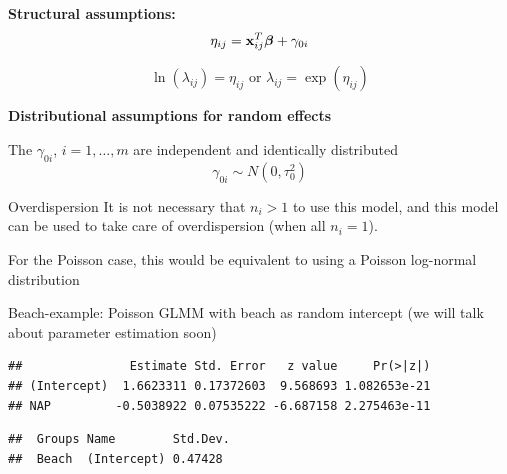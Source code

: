 \documentclass[
  ignorenonframetext,
]{beamer}
\newenvironment{Shaded}{\begin{snugshade}}{\end{snugshade}}
\newcommand{\AttributeTok}[1]{\textcolor[rgb]{0.13,0.29,0.53}{#1}}
\newcommand{\DecValTok}[1]{\textcolor[rgb]{0.00,0.00,0.81}{#1}}
\newcommand{\FunctionTok}[1]{\textcolor[rgb]{0.13,0.29,0.53}{\textbf{#1}}}
\newcommand{\NormalTok}[1]{#1}
\newcommand{\OtherTok}[1]{\textcolor[rgb]{0.56,0.35,0.01}{#1}}
\newcommand{\SpecialCharTok}[1]{\textcolor[rgb]{0.81,0.36,0.00}{\textbf{#1}}}
\begin{document}
\begin{frame}
\textbf{Structural assumptions:}
\[\eta_{ij}={\bf x}_{ij}^T {\boldsymbol \beta}+ \gamma_{0i}\]

\[\ln(\lambda_{ij})=\eta_{ij} \text{ or } \lambda_{ij}=\exp(\eta_{ij})\]

\textbf{Distributional assumptions for random effects}

The \(\gamma_{0i}\), \(i=1,\ldots,m\) are independent and identically
distributed \[\gamma_{0i}\sim N(0,\tau_0^2)\]
\end{frame}

\begin{frame}
\begin{block}{Overdispersion}
\protect{}\label{overdispersion}
It is not necessary that \(n_i>1\) to use this model, and this model can
be used to take care of overdispersion (when all \(n_i=1\)).

For the Poisson case, this would be equivalent to using a Poisson
log-normal distribution
\end{block}
\end{frame}

\begin{frame}[fragile]
\begin{block}{Beach-example: Poisson GLMM with beach as random
intercept}
\protect{}\label{beach-example-poisson-glmm-with-beach-as-random-intercept}
(we will talk about parameter estimation soon)

\begin{Shaded}
\end{Shaded}

\begin{verbatim}
##               Estimate Std. Error   z value     Pr(>|z|)
## (Intercept)  1.6623311 0.17372603  9.568693 1.082653e-21
## NAP         -0.5038922 0.07535222 -6.687158 2.275463e-11
\end{verbatim}

\begin{Shaded}
\end{Shaded}

\begin{verbatim}
##  Groups Name        Std.Dev.
##  Beach  (Intercept) 0.47428
\end{verbatim}
\end{block}
\end{frame}
\end{document}
